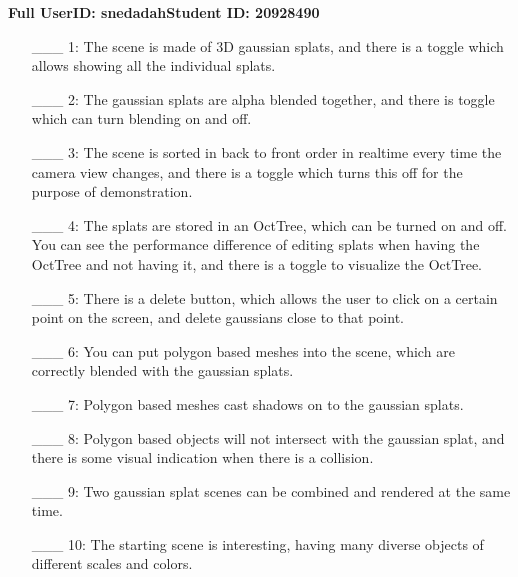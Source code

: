 \documentclass {article}
\begin{document}

{\hfill{\bf Full UserID: snedadah}\hfill{\bf Student ID: 20928490}\hfill}

\begin{enumerate}
     \item[\_\_\_ 1:] The scene is made of 3D gaussian splats, and there is a toggle which allows showing all the individual splats.
     
     \item[\_\_\_ 2:] The gaussian splats are alpha blended together, and there is toggle which can turn blending on and off.

     \item[\_\_\_ 3:] The scene is sorted in back to front order in realtime every time the camera view changes, and there is a toggle which turns this off for the purpose of demonstration.

     \item[\_\_\_ 4:] The splats are stored in an OctTree, which can be turned on and off. You can see the performance difference of editing splats when having the OctTree and not having it, and there is a toggle to visualize the OctTree.

     \item[\_\_\_ 5:]  There is a delete button, which allows the user to click on a certain point on the screen, and delete gaussians close to that point.

     \item[\_\_\_ 6:] You can put polygon based meshes into the scene, which are correctly blended with the gaussian splats.

     \item[\_\_\_ 7:] Polygon based meshes cast shadows on to the gaussian splats.

     \item[\_\_\_ 8:] Polygon based objects will not intersect with the gaussian splat, and there is some visual indication when there is a collision.

     \item[\_\_\_ 9:]  Two gaussian splat scenes can be combined and rendered at the same time.

     \item[\_\_\_ 10:] The starting scene is interesting, having many diverse objects of different scales and colors.


\end{enumerate}

\end{document}
